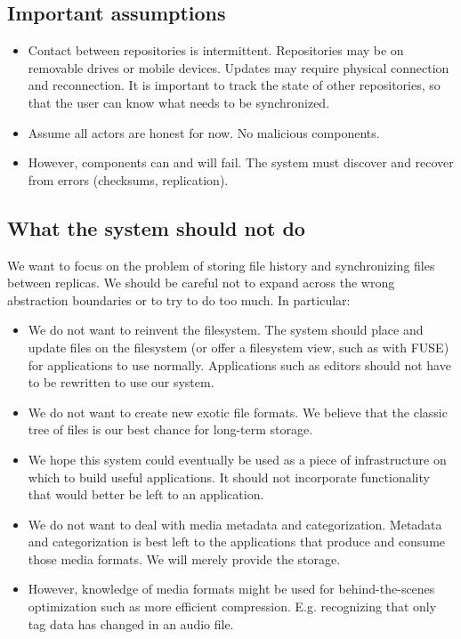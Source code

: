 \documentclass[a4paper]{article}
\begin{document}
\subsection{Important assumptions}

\begin{itemize}

  \item Contact between repositories is intermittent. Repositories may be on
    removable drives or mobile devices. Updates may require physical connection
    and reconnection. It is important to track the state of other repositories,
    so that the user can know what needs to be synchronized.

  \item Assume all actors are honest for now. No malicious components.

  \item However, components can and will fail. The system must discover and
    recover from errors (checksums, replication).

\end{itemize}


\subsection{What the system should not do}

We want to focus on the problem of storing file history and synchronizing files
between replicas.
We should be careful not to expand across the wrong abstraction boundaries or to
try to do too much.
In particular:

\begin{itemize}

  \item We do not want to reinvent the filesystem. The system should place and
    update files on the filesystem (or offer a filesystem view, such as with
    FUSE) for applications to use normally. Applications such as editors should
    not have to be rewritten to use our system.

  \item We do not want to create new exotic file formats. We believe that the
    classic tree of files is our best chance for long-term storage.

  \item We hope this system could eventually be used as a piece of
    infrastructure on which to build useful applications. It should not
    incorporate functionality that would better be left to an application.

  \item We do not want to deal with media metadata and categorization. Metadata
    and categorization is best left to the applications that produce and consume
    those media formats. We will merely provide the storage.

  \item However, knowledge of media formats might be used for behind-the-scenes
    optimization such as more efficient compression. E.g. recognizing that only
    tag data has changed in an audio file.

\end{itemize}
\end{document}
